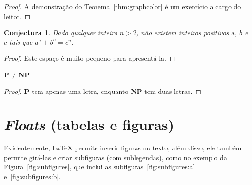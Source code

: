 \begin{proof}
  A demonstração do Teorema~\ref{thm:graphcolor} é um exercício
  a cargo do leitor.
  \renewcommand\qedsymbol{} %
\end{proof}

\theoremstyle{maybe} %
\newtheorem{conjecture}{Conjectura}

\begin{conjecture}
  \label{conj:fermat}
  Dado qualquer inteiro $n > 2$, não existem inteiros positivos
  $a$, $b$ e $c$ tais que $a^n + b^n = c^n$.
\end{conjecture}

\begin{proof}
  Este espaço é muito pequeno para apresentá-la.
  \renewcommand\qedsymbol{}
\end{proof}

\begin{theorem}
  \label{thm:pnp}
  \textup{\textsf{\textbf{P$\ne$NP}}}
\end{theorem}

\begin{proof}
  \textsf{\textbf{P}} tem apenas uma letra, enquanto
  \textsf{\textbf{NP}} tem duas letras.
\end{proof}

\section{\emph{Floats} (tabelas e figuras)}

Evidentemente, \LaTeX{} permite inserir figuras no texto; além disso, ele
também permite girá-las e criar subfiguras (com sublegendas),
como no exemplo da Figura~\ref{fig:subfigures}, que inclui
as subfiguras~\ref{fig:subfigures:a} e~\ref{fig:subfigures:b}.


